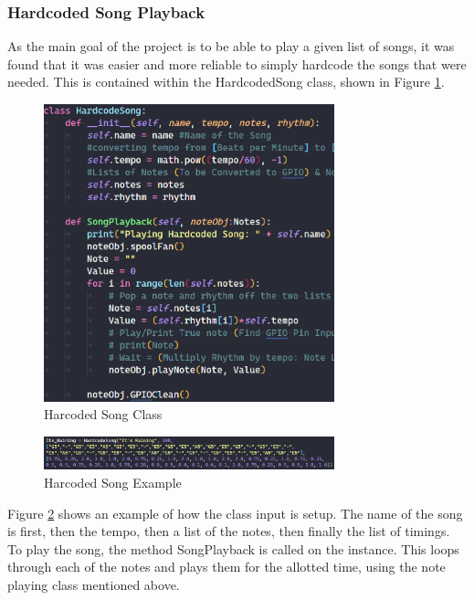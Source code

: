 \documentclass[UTF8, 12pt]{article}
\begin{document}
\subsubsection{Hardcoded Song Playback}
    As the main goal of the project is to be able to play a given list of songs, it was found that it was easier and more reliable to simply hardcode the songs that were needed. This is contained within the HardcodedSong class, shown in Figure \ref{hardcode_fig}.
    \begin{figure}[h]
        \centering
        \includegraphics[width=0.75\textwidth]{hardcode_class.png}
        \caption{Harcoded Song Class}
        \label{hardcode_fig}
    \end{figure}
    \begin{figure}[h]
        \centering
        \includegraphics[width=0.75\textwidth]{hardcode_example.png}
        \caption{Harcoded Song Example}
        \label{hardcode_ex_fig}
    \end{figure}
    Figure \ref{hardcode_ex_fig} shows an example of how the class input is setup. The name of the song is first, then the tempo, then a list of the notes, then finally the list of timings. To play the song, the method SongPlayback is called on the instance. This loops through each of the notes and plays them for the allotted time, using the note playing class mentioned above.
\end{document}
